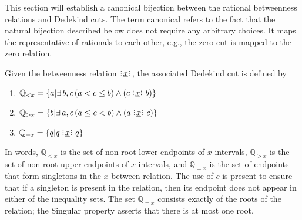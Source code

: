 \documentclass[12pt]{article}
\newcommand{\qcut}[2][x]{\ensuremath{\mathbb{Q}_{#2 #1}}}
\newcommand{\qlt}[1][x]{\qcut[#1]{<}}
\newcommand{\qeq}[1][x]{\qcut[#1]{=}}
\newcommand{\qgt}[1][x]{\qcut[#1]{>}}
\begin{document}
This section will establish a canonical bijection between the rational betweenness relations and Dedekind cuts. The term canonical refers to the fact that the natural bijection described below does not require any arbitrary choices. It maps the representative of rationals to each other, e.g., the zero cut is mapped to the zero relation. 

Given the betweenness relation $\xrel$, the associated Dedekind cut is defined by \begin{enumerate}
    \item $\qlt = \{ a | \exists\, b, c \, (a < c \leq b) \wedge (c \xrel b) \} $
    \item $\qgt = \{ b | \exists\, a, c \, (a \leq c < b) \wedge (a \xrel c) \} $
    \item $\qeq = \{ q | q \xrel q \} $
\end{enumerate}
In words, $\qlt$ is the set of non-root lower endpoints of $x$-intervals, $\mathbb{Q}_{>x}$ is the set of non-root upper endpoints of $x$-intervals, and $\qeq$ is the set of endpoints that form singletons in the $x$-between relation. The use of $c$ is present to ensure that if a singleton is present in the relation, then its endpoint does not appear in either of the inequality sets. The set $\qeq$ consists exactly of the roots of the relation; the Singular property asserts that there is at most one root. 
\end{document}
